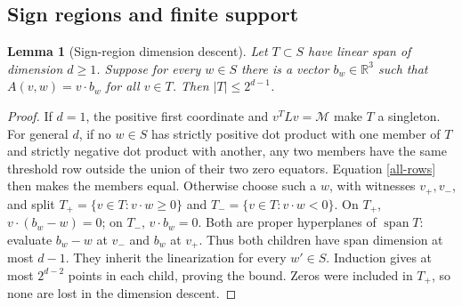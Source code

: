 \documentclass[11pt]{article}
\newtheorem{lemma}[theorem]{Lemma}
\theoremstyle{remark}\newtheorem{remark}[theorem]{Remark}
\newcommand{\R}{\mathbb R}
\numberwithin{equation}{section}
\begin{document}
\subsection{Sign regions and finite support}
\begin{lemma}[Sign-region dimension descent]\label{descent}
Let $T\subset S$ have linear span of dimension $d\ge1$.
Suppose for every $w\in S$ there is a vector $b_w\in\R^3$ such that
$A(v,w)=v\cdot b_w$ for all $v\in T$. Then $|T|\le2^{d-1}$.
\end{lemma}
\begin{proof}
If $d=1$, the positive first coordinate and $v^TLv=\mathcal M$ make $T$ a singleton.
For general $d$, if no $w\in S$ has strictly positive dot product with one member
of $T$ and strictly negative dot product with another, any two members have the
same threshold row outside the union of their two zero equators.
Equation \eqref{all-rows} then makes the members equal.
Otherwise choose such a $w$, with witnesses $v_+,v_-$, and split
$T_+=\{v\in T:v\cdot w\ge0\}$ and $T_-=\{v\in T:v\cdot w<0\}$.
On $T_+$, $v\cdot(b_w-w)=0$; on $T_-$, $v\cdot b_w=0$.
Both are proper hyperplanes of $\operatorname{span}T$: evaluate $b_w-w$ at $v_-$
and $b_w$ at $v_+$. Thus both children have span dimension at most $d-1$.
They inherit the linearization for every $w'\in S$.
Induction gives at most $2^{d-2}$ points in each child, proving the bound.
Zeros were included in $T_+$, so none are lost in the dimension descent.
\end{proof}
\end{document}
